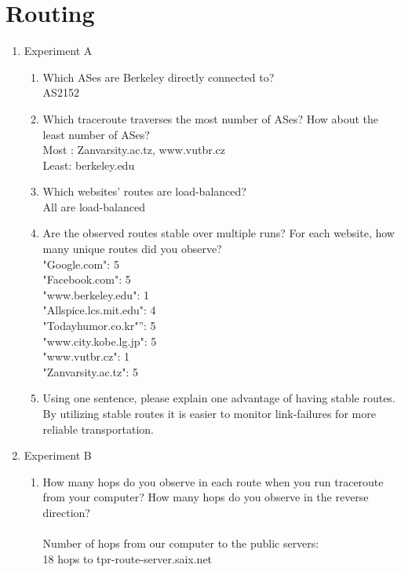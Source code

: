 \documentclass{article}
\begin{document}
\section{Routing}
\begin{enumerate}
    \item Experiment A
    \begin{enumerate}
        \item Which ASes are Berkeley directly connected to?\\
        AS2152
        \item Which traceroute traverses the most number of ASes? How about the least number of ASes?\\
        Most : Zanvarsity.ac.tz, www.vutbr.cz\\
        Least: berkeley.edu
        \item Which websites' routes are load-balanced?\\
        All are load-balanced
        \item Are the observed routes stable over multiple runs? For each website, how many unique routes did you observe?\\
        "Google.com": 5\\
        "Facebook.com": 5\\
        "www.berkeley.edu": 1\\
        "Allspice.lcs.mit.edu": 4\\
        "Todayhumor.co.kr"”: 5\\
        "www.city.kobe.lg.jp": 5\\
        "www.vutbr.cz": 1\\
        "Zanvarsity.ac.tz": 5
        \item Using one sentence, please explain one advantage of having stable routes.\\
            By utilizing stable routes it is easier to monitor link-failures for more reliable transportation.
    \end{enumerate}
    \item Experiment B
    \begin{enumerate}
    \item How many hops do you observe in each route when you run traceroute from your computer? How many hops do you observe in the reverse direction?\\ \\
    Number of hops from our computer to the public servers:\\
    18 hops to tpr-route-server.saix.net\\

\end{enumerate}
\end{enumerate}
\end{document}
